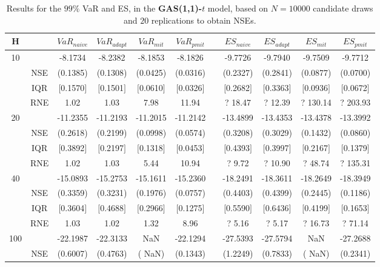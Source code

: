 \footnotesize{  
{ \renewcommand{\arraystretch}{1.3} 
\begin{longtable}{ccccccccccc}  
\caption{Results for the $99\%$ VaR and ES, in the \textbf{GAS(1,1)-$t$} model, based on $N=10000$ candidate draws and $20$ replications to obtain NSEs.} 
\label{tab:res_algos_t_gas} \\ 
 H & & $VaR_{naive}$ & $VaR_{adapt}$ & $VaR_{mit}$  & $VaR_{pmit}$ &  & $ES_{naive}$ & $ES_{adapt}$ & $ES_{mit}$ & $ES_{pmit}$ \\ \hline 
10 & & -8.1734 & -8.2382 & -8.1853 & -8.1826 & & -9.7726 & -9.7940 & -9.7509 & -9.7712  \\ 
  & NSE & (0.1385) & (0.1308) & (0.0425) & (0.0316) & & (0.2327) & (0.2841) & (0.0877) & (0.0700)   \\ 
 & IQR & $[$0.1570$]$ & $[$0.1501$]$ & $[$0.0610$]$ & $[$0.0326$]$ & & $[$0.2682$]$ & $[$0.3363$]$  &$[$0.0936$]$ & $[$0.0672$]$  \\  
  & RNE &   1.02 &   1.03 &   7.98 &  11.94 &  &?  18.47 & ?  12.39 &  ? 130.14 & ? 203.93   \\ [1ex] 
20 & & -11.2355 & -11.2193 & -11.2015 & -11.2142 & & -13.4899 & -13.4353 & -13.4378 & -13.3992  \\ 
  & NSE & (0.2618) & (0.2199) & (0.0998) & (0.0574) & & (0.3208) & (0.3029) & (0.1432) & (0.0860)   \\ 
 & IQR & $[$0.3892$]$ & $[$0.2197$]$ & $[$0.1318$]$ & $[$0.0453$]$ & & $[$0.4393$]$ & $[$0.3997$]$  &$[$0.2167$]$ & $[$0.1379$]$  \\  
  & RNE &   1.02 &   1.03 &   5.44 &  10.94 &  &?   9.72 & ?  10.90 &  ?  48.74 & ? 135.31   \\ [1ex] 
40 & & -15.0893 & -15.2753 & -15.1611 & -15.2360 & & -18.2491 & -18.3611 & -18.2649 & -18.3949  \\ 
  & NSE & (0.3359) & (0.3231) & (0.1976) & (0.0757) & & (0.4403) & (0.4399) & (0.2445) & (0.1186)   \\ 
 & IQR & $[$0.3604$]$ & $[$0.4688$]$ & $[$0.2966$]$ & $[$0.1275$]$ & & $[$0.5590$]$ & $[$0.6436$]$  &$[$0.4199$]$ & $[$0.1653$]$  \\  
  & RNE &   1.03 &   1.02 &   1.32 &   8.96 &  &?   5.16 & ?   5.17 &  ?  16.73 & ?  71.14   \\ [1ex] 
100 & & -22.1987 & -22.3133 &    NaN & -22.1294 & & -27.5393 & -27.5794 &    NaN & -27.2688  \\ 
  & NSE & (0.6007) & (0.4763) & (   NaN) & (0.1343) & & (1.2249) & (0.7833) & (   NaN) & (0.2341)   \\ 

\end{longtable}}}

